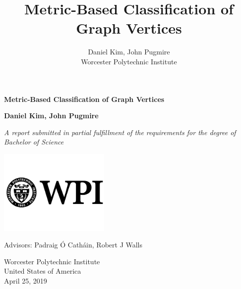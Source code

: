 \documentclass[11pt,oneside]{report}
\theoremstyle{definition}
\begin{document}
\title{Metric-Based Classification of Graph Vertices}
\author{Daniel Kim, John Pugmire\\Worcester Polytechnic Institute\\}


\begin{titlepage}
    \begin{center}
        \vspace*{1cm}
 
        \Huge
        \textbf{Metric-Based Classification of Graph Vertices}
 
        \vspace{0.5cm}
        \LARGE
 
        \vspace{1.5cm}
 
        \textbf{Daniel Kim, John Pugmire}
 
        \vfill

        \large
 
        \textit{A report submitted in partial fulfillment of the requirements for the degree of
          Bachelor of Science}
 
        \vspace{0.8cm}
 
        \includegraphics[width=0.4\textwidth]{university}
 
        \Large
        Advisors: Padraig Ó Catháin, Robert J Walls \\
        \vspace{0.5cm}
        \large

        Worcester Polytechnic Institute\\
        United States of America\\
        April 25, 2019
 
    \end{center}
\end{titlepage}

\newpage


\newpage

\tableofcontents
\end{document}
